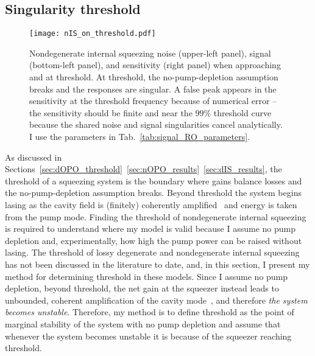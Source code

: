 \subsection{Singularity threshold}
\label{sec:singularity_threshold}


\begin{figure}
    \centering
    \texttt{[image: nIS\_on\_threshold.pdf]}
    \caption{Nondegenerate internal squeezing noise (upper-left panel), signal (bottom-left panel), and sensitivity (right panel) when approaching and at threshold. At threshold, the no-pump-depletion assumption breaks and the responses are singular. A false peak appears in the sensitivity at the threshold frequency because of numerical error -- the sensitivity should be finite and near the $99\%$ threshold curve because the shared noise and signal singularities cancel analytically. I use the parameters in Tab.~\ref{tab:signal_RO_parameters}. %
    }
    \label{fig:nIS_on_threshold}
\end{figure}

As discussed in Sections~\ref{sec:dOPO_threshold}~\ref{sec:nOPO_results}~\ref{sec:dIS_results}, the threshold of a squeezing system is the boundary where gains balance losses and the no-pump-depletion assumption breaks. Beyond threshold the system begins lasing as the cavity field is (finitely) coherently amplified~\cite{martinelli2001classical} and energy is taken from the pump mode.
Finding the threshold of nondegenerate internal squeezing is required to understand where my model is valid because I assume no pump depletion and, experimentally, how high the pump power can be raised without lasing.
The threshold of lossy degenerate and nondegenerate internal squeezing has not been discussed in the literature to date, and, in this section, I present my method for determining threshold in these models. %
Since I assume no pump depletion, beyond threshold, the net gain at the squeezer instead leads to unbounded, coherent amplification of the cavity mode~\cite{walls_1995}, and therefore \emph{the system becomes unstable}. Therefore, my method is to define threshold as the point of marginal stability of the system with no pump depletion and assume that whenever the system becomes unstable it is because of the squeezer reaching threshold.

